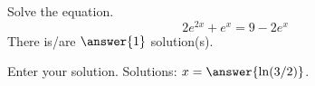 \documentclass{ximera}
\author{Bobby Ramsey}
\begin{document}
\begin{exercise}
	Solve the equation.
	\[ 2e^{2x} + e^x  = 9 - 2 e^x \]
	There is/are $\answer{1}$ solution(s).
	\begin{exercise}
		Enter your solution.
		Solutions: $x = \answer{ \ln(3/2) }$.
	\end{exercise}
\end{exercise}
\end{document}
